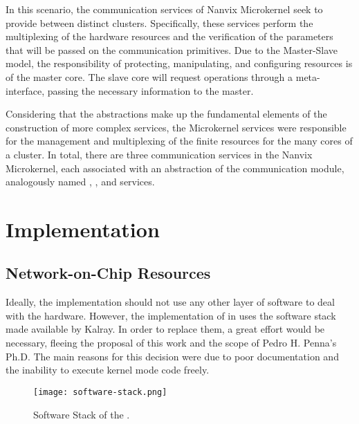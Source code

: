 			In this scenario, the communication services of Nanvix Microkernel seek
			to provide \ipc between distinct clusters.
			Specifically, these services perform the multiplexing of the hardware
			resources and the verification of the parameters that will be passed
			on the communication primitives.
			Due to the Master-Slave model, the responsibility of protecting,
			manipulating, and configuring \hal resources is of the master core.
			The slave core will request operations through a meta-interface,
			passing the necessary information to the master.

			Considering that the abstractions make up the fundamental elements of
			the construction of more complex services, the Microkernel services
			were responsible for the management and multiplexing of the finite
			resources for the many cores of a cluster.
			In total, there are three communication services in the Nanvix Microkernel,
			each associated with an abstraction of the communication module,
			analogously named \sync, \mailbox, and \portal services.
	
	\section{Implementation}


		\subsection*{Network-on-Chip Resources}


			Ideally, the \hal implementation should not use any other layer of software to
			deal with the hardware. However, the implementation of \hal in \mppa uses the
			software stack made available by Kalray.
			In order to replace them, a great effort would be necessary, fleeing the proposal
			of this work and the scope of Pedro H. Penna's Ph.D.
			The main reasons for this decision were due to poor documentation and the
			inability to execute kernel mode code freely.

			\begin{figure}[t]
				\centering
				\caption{Software Stack of the \mppa.}
				\label{fig:software-stack}
				\texttt{[image: software-stack.png]}
			\end{figure}

